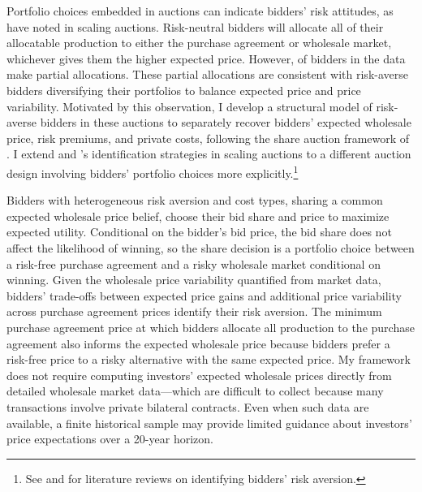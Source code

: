 \documentclass[12pt]{article}
\theoremstyle{definition} %
\begin{document}
Portfolio choices embedded in auctions can indicate bidders' risk attitudes, as \citet{Athey2001} have noted in scaling auctions. Risk-neutral bidders will allocate all of their allocatable production to either the purchase agreement or wholesale market, whichever gives them the higher expected price. However,  of bidders in the data make partial allocations. These partial allocations are consistent with risk-averse bidders diversifying their portfolios to balance expected price and price variability. Motivated by this observation, I develop a structural model of risk-averse bidders in these auctions to separately recover bidders' expected wholesale price, risk premiums, and private costs, following the share auction framework of \citet{Wilson1979}. I extend \citet{Bolotnyy2023} and \citet{Luo2024}'s identification strategies in scaling auctions to a different auction design involving bidders' portfolio choices more explicitly.\footnote{
See \citet{Perrigne2019} and \citet{Vasserman2021} for literature reviews on identifying bidders' risk aversion.
}

Bidders with heterogeneous risk aversion and cost types, sharing a common expected wholesale price belief, choose their bid share and price to maximize expected utility. Conditional on the bidder's bid price, the bid share does not affect the likelihood of winning, so the share decision is a portfolio choice between a risk-free purchase agreement and a risky wholesale market conditional on winning. Given the wholesale price variability quantified from market data, bidders' trade-offs between expected price gains and additional price variability across purchase agreement prices identify their risk aversion. The minimum purchase agreement price at which bidders allocate all production to the purchase agreement also informs the expected wholesale price because bidders prefer a risk-free price to a risky alternative with the same expected price. My framework does not require computing investors' expected wholesale prices directly from detailed wholesale market data---which are difficult to collect because many transactions involve private bilateral contracts. Even when such data are available, a finite historical sample may provide limited guidance about investors' price expectations over a 20-year horizon.
\end{document}
